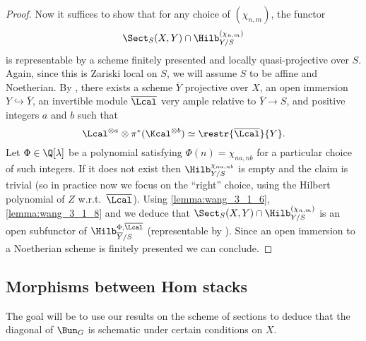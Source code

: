\begin{proof}
               Now it suffices to show that for any choice of $(\chi_{n,m})$, the functor \[\Sect_S(X, Y) \cap \Hilb_{Y/S}^{(\chi_{n,m})} \] is representable by a scheme finitely presented and locally quasi-projective over $S$. Again, since this is Zariski local on $S$, we will assume $S$ to be affine and Noetherian. By \cite[Prop~4.4.6, 4.6.12, 4.6.13]{EGA2}, there exists a scheme $\overline{Y}$ projective over $X$, an open immersion $Y \hookrightarrow \overline{Y}$, an invertible module $\overline{\Lcal}$ very ample relative to $\overline{Y} \to S$, and positive integers $a$ and $b$ such that \[\Lcal^{\otimes a} \otimes \pi^*(\Kcal^{\otimes b}) \simeq \restr{\overline{\Lcal}}{Y}. \]
               Let $\Phi \in \Q[\lambda]$ be a polynomial satisfying $\Phi(n) = \chi_{na, nb}$ for a particular choice of such integers. If it does not exist then $\Hilb_{Y/S}^{\chi_{na, nb}}$ is empty and the claim is trivial (so in practice now we focus on the ``right'' choice, using the Hilbert polynomial of $Z$ w.r.t.\ $\overline{\Lcal}$). Using \cref{lemma:wang_3_1_6}, \cref{lemma:wang_3_1_8} and \cite[Theorem~2.6, Step IV]{ak80} we deduce that $\Sect_S(X, Y) \cap \Hilb_{Y/S}^{(\chi_{n,m})}$ is an open subfunctor of $\Hilb_{\overline{Y}/S}^{\Phi, \overline{\Lcal}}$ (representable by \cite[Corollary~2.8]{ak80}). Since an open immersion to a Noetherian scheme is finitely presented we can conclude.
           \end{proof}

        \subsection{Morphisms between Hom stacks}
           The goal will be to use our results on the scheme of sections to deduce that the diagonal of $\Bun_G$ is schematic under certain conditions on $X$.


